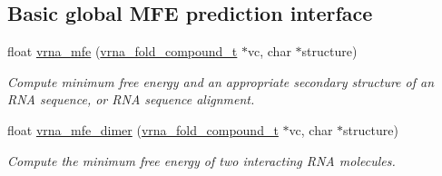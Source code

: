 \subsection*{Basic global M\+FE prediction interface}
\begin{DoxyCompactItemize}
\item 
float \mbox{\hyperlink{group__mfe__global_gabd3b147371ccf25c577f88bbbaf159fd}{vrna\+\_\+mfe}} (\mbox{\hyperlink{group__fold__compound_ga1b0cef17fd40466cef5968eaeeff6166}{vrna\+\_\+fold\+\_\+compound\+\_\+t}} $\ast$vc, char $\ast$structure)
\begin{DoxyCompactList}\small\item\em Compute minimum free energy and an appropriate secondary structure of an R\+NA sequence, or R\+NA sequence alignment. \end{DoxyCompactList}\item 
float \mbox{\hyperlink{group__mfe__global_gaab22d10c1190f205f16a77cab9d5d3ee}{vrna\+\_\+mfe\+\_\+dimer}} (\mbox{\hyperlink{group__fold__compound_ga1b0cef17fd40466cef5968eaeeff6166}{vrna\+\_\+fold\+\_\+compound\+\_\+t}} $\ast$vc, char $\ast$structure)
\begin{DoxyCompactList}\small\item\em Compute the minimum free energy of two interacting R\+NA molecules. \end{DoxyCompactList}\end{DoxyCompactItemize}
